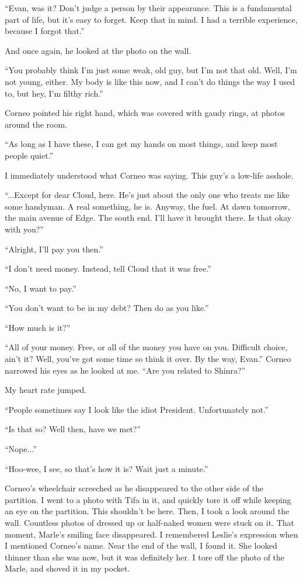 \documentclass[oneside]{book}
\begin{document}
“Evan, was it? Don’t judge a person by their appearance. This is a fundamental part of life, but it’s easy to forget. Keep that in mind. I had a terrible experience, because I forgot that.”

And once again, he looked at the photo on the wall.

“You probably think I’m just some weak, old guy, but I’m not that old. Well, I’m not young, either. My body is like this now, and I can’t do things the way I used to, but hey, I’m filthy rich.”

Corneo pointed his right hand, which was covered with gaudy rings, at photos around the room.

“As long as I have these, I can get my hands on most things, and keep most people quiet.”

I immediately understood what Corneo was saying. This guy’s a low-life asshole.

“...Except for dear Cloud, here. He’s just about the only one who treats me like some handyman. A real something, he is. Anyway, the fuel. At dawn tomorrow, the main avenue of Edge. The south end. I’ll have it brought there. Is that okay with you?”

“Alright, I’ll pay you then.”

“I don’t need money. Instead, tell Cloud that it was free.”

“No, I want to pay.”

“You don’t want to be in my debt? Then do as you like.”

“How much is it?”

“All of your money. Free, or all of the money you have on you. Difficult choice, ain’t it? Well, you’ve got some time so think it over. By the way, Evan.” Corneo narrowed his eyes as he looked at me. “Are you related to Shinra?”

My heart rate jumped.

“People sometimes say I look like the idiot President. Unfortunately not.”

“Is that so? Well then, have we met?”

“Nope...”

“Hoo-wee, I see, so that’s how it is? Wait just a minute.”

Corneo’s wheelchair screeched as he disappeared to the other side of the partition. I went to a photo with Tifa in it, and quickly tore it off while keeping an eye on the partition. This shouldn’t be here. Then, I took a look around the wall. Countless photos of dressed up or half-naked women were stuck on it. That moment, Marle’s smiling face disappeared. I remembered Leslie’s expression when I mentioned Corneo’s name. Near the end of the wall, I found it. She looked thinner than she was now, but it was definitely her. I tore off the photo of the Marle, and shoved it in my pocket.
\end{document}
